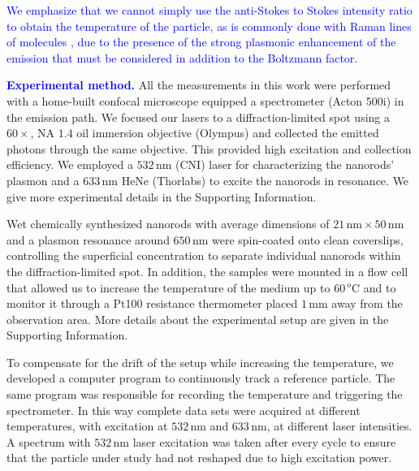 \documentclass[journal=nalefd,manuscript=letter]{achemso}
\newcommand{\HI}[1]{\textcolor{blue}{#1}} %
\newcommand{\nm}{\ensuremath{\,\textrm{nm}}}
\newcommand{\mm}{\ensuremath{\,\textrm{mm}}}
\newcommand{\degree}{\ensuremath{\,^o\textrm{C}}}
\begin{document}
\HI{We emphasize that we cannot simply use the anti-Stokes to Stokes intensity ratio to 
obtain the temperature of the particle, as is commonly done with Raman lines of molecules 
\cite{krishnan1928influence,zondervan2006single}, due to the presence of the strong plasmonic enhancement
of the emission that must be considered in addition to the Boltzmann factor.}

\HI{\textbf{Experimental method.}} All the measurements in this work were performed with a home-built confocal
microscope equipped a spectrometer (Acton 500i) in the emission path.  We focused
our lasers to a diffraction-limited spot using a $60\times$, NA $1.4$ oil immersion
objective (Olympus) and collected the emitted photons through the same
objective. This provided high excitation and collection efficiency.
We employed a $532\nm$ (CNI) laser for characterizing the nanorods' plasmon and
a $633\nm$ HeNe (Thorlabs) to excite the nanorods in resonance.
We give more experimental details in the Supporting Information.

Wet chemically synthesized nanorods\cite{Nikoobakht2003} with average dimensions
of $21\nm\times50\nm$ and a plasmon resonance around $650\nm$ were spin-coated
onto clean coverslips, controlling the superficial concentration to separate
individual nanorods within the diffraction-limited spot\cite{Zijlstra2011}.
In addition, the samples were mounted in a flow cell that allowed us to increase
the temperature of the medium up to $60\degree$ and to monitor it through a
Pt100 resistance thermometer placed $1\mm$ away from the observation area. More
details about the experimental setup are given in the Supporting Information.

To compensate for the drift of the setup while increasing the temperature, we
developed a computer program to continuously track a reference particle. The
same program was responsible for recording the temperature and triggering the
spectrometer. In this way complete data sets were acquired at different
temperatures, with excitation at $532\nm$ and $633\nm$, at
different laser intensities. A
spectrum with $532\nm$ laser excitation was taken after every cycle to ensure
that the particle under study had not reshaped due to high excitation power.
\end{document}
